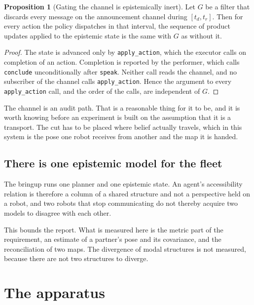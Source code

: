 \documentclass[11pt,a4paper]{article}
\theoremstyle{definition}
\newtheorem{proposition}{Proposition}
\newcommand{\code}[1]{\texttt{\small #1}}
\begin{document}
\begin{proposition}[Gating the channel is epistemically inert]
\label{prop:inert}
Let $G$ be a filter that discards every message on the announcement channel
during $[t_{d}, t_{r}]$. Then for every action the policy dispatches in that
interval, the sequence of product updates applied to the epistemic state is the
same with $G$ as without it.
\end{proposition}

\begin{proof}
The state is advanced only by \code{apply\_action}, which the executor calls on
completion of an action. Completion is reported by the performer, which calls
\code{conclude} unconditionally after \code{speak}. Neither call reads the
channel, and no subscriber of the channel calls \code{apply\_action}. Hence the
argument to every \code{apply\_action} call, and the order of the calls, are
independent of $G$.
\end{proof}

The channel is an audit path. That is a reasonable thing for it to be, and it
is worth knowing before an experiment is built on the assumption that it is a
transport. The cut has to be placed where belief actually travels, which in
this system is the pose one robot receives from another and the map it is
handed.

\subsection{There is one epistemic model for the fleet}
\label{sec:onemodel}

The bringup runs one planner and one epistemic state. An agent's accessibility
relation is therefore a column of a shared structure and not a perspective held
on a robot, and two robots that stop communicating do not thereby acquire two
models to disagree with each other.

This bounds the report. What is measured here is the metric part of the
requirement, an estimate of a partner's pose and its covariance, and the
reconciliation of two maps. The divergence of modal structures is not measured,
because there are not two structures to diverge.

\section{The apparatus}
\label{sec:apparatus}
\end{document}
